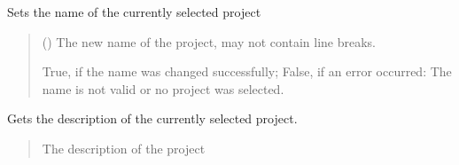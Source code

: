 \documentclass[letterpaper,10pt,english]{sphinxmanual}
\begin{document}
\begin{fulllineitems}
\begin{fulllineitems}
\begin{quote}
\begin{description}
\sphinxAtStartPar
{}

\end{description}\end{quote}

\end{fulllineitems}


\begin{fulllineitems}
\label{\detokenize{apidoc/src.osm_configurator.control:src.osm_configurator.control.settings_controller.SettingsController.set_project_name}}
\pysigstartsignatures
{}
\pysigstopsignatures
\sphinxAtStartPar
Sets the name of the currently selected project
\begin{quote}\begin{description}
\sphinxAtStartPar
{} () \textendash{} The new name of the project, may not contain line breaks.

\sphinxAtStartPar
True, if the name was changed successfully; False, if an error occurred: The name is not valid or no project was selected.

\sphinxAtStartPar
{}

\end{description}\end{quote}

\end{fulllineitems}


\begin{fulllineitems}
\label{\detokenize{apidoc/src.osm_configurator.control:src.osm_configurator.control.settings_controller.SettingsController.get_project_description}}
\pysigstartsignatures
{}
\pysigstopsignatures
\sphinxAtStartPar
Gets the description of the currently selected project.
\begin{quote}\begin{description}
\sphinxAtStartPar
The description of the project


\end{description}
\end{quote}
\end{fulllineitems}
\end{fulllineitems}
\end{document}
